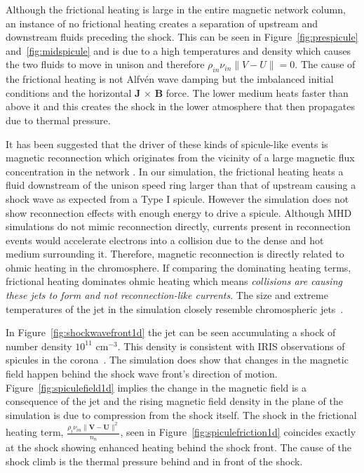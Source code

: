 \documentclass[12pt,upcase]{umlthesis}
\begin{document}
Although the frictional heating is large in the entire magnetic network column, an instance of no frictional heating creates a separation of upstream and downstream fluids preceding the shock. This can be seen in Figure~\ref{fig:prespicule} and~\ref{fig:midspicule} and is due to a high temperatures and density which causes the two fluids to move in unison and therefore $\rho_{in} \nu_{in} \|V-U\| = 0$. The cause of the frictional heating is not Alfv\'en wave damping but the imbalanced initial conditions and the horizontal \textbf{J} $\times$ \textbf{B} force. The lower medium heats faster than above it and this creates the shock in the lower atmosphere that then propagates due to thermal pressure.

It has been suggested that the driver of these kinds of spicule-like events is magnetic reconnection which originates from the vicinity of a large magnetic flux concentration in the network \citep{Pontieu2007}. In our simulation, the frictional heating heats a fluid downstream of the unison speed ring larger than that of upstream causing a shock wave as expected from a Type I spicule. However the simulation does not show reconnection effects with enough energy to drive a spicule. Although MHD simulations do not mimic reconnection directly, currents present in reconnection events would accelerate electrons into a collision due to the dense and hot medium surrounding it. Therefore, magnetic reconnection is directly related to ohmic heating in the chromosphere. If comparing the dominating heating terms, frictional heating dominates ohmic heating which means {\it collisions are causing these jets to form and not reconnection-like currents}. The size and extreme temperatures of the jet in the simulation closely resemble chromospheric jets~\citep{Shimojo2000,Nishizuka2011}.

In Figure~\ref{fig:shockwavefront1d} the jet can be seen accumulating a shock of number density $10^{11}$ cm$^{-3}$. This density is consistent with IRIS observations of spicules in the corona~\citep{Alissandrakis2018}. The simulation does show that changes in the magnetic field happen behind the shock wave front's direction of motion. Figure~\ref{fig:spiculefield1d} implies the change in the magnetic field is a consequence of the jet and the rising magnetic field density in the plane of the simulation is due to compression from the shock itself. The shock in the frictional heating term, $\frac{\rho_i \nu_{in} \| \textbf{V} - \textbf{U} \|^2}{n_n}$, seen in Figure~\ref{fig:spiculefriction1d} coincides exactly at the shock showing enhanced heating behind the shock front. The cause of the shock climb is the thermal pressure behind and in front of the shock.
\end{document}

